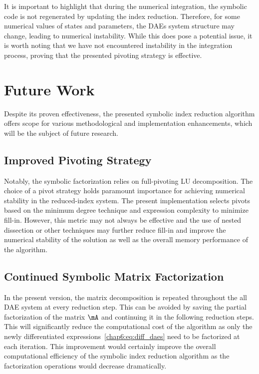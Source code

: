 It is important to highlight that during the numerical integration, the symbolic code is not regenerated by updating the index reduction. Therefore, for some numerical values of states and parameters, the \acp{DAE} system structure may change, leading to numerical instability. While this does pose a potential issue, it is worth noting that we have not encountered instability in the integration process, proving that the presented pivoting strategy is effective.

%


\section{Future Work}
\label{chap6:sec:future_work}

Despite its proven effectiveness, the presented symbolic index reduction algorithm offers scope for various methodological and implementation enhancements, which will be the subject of future research.

\subsection{Improved Pivoting Strategy}

Notably, the symbolic factorization relies on full-pivoting \ac{LU} decomposition. The choice of a pivot strategy holds paramount importance for achieving numerical stability in the reduced-index system. The present implementation selects pivots based on the minimum degree technique and expression complexity to minimize fill-in. However, this metric may not always be effective and the use of nested dissection or other techniques may further reduce fill-in and improve the numerical stability of the solution as well as the overall memory performance of the algorithm.

\subsection{Continued Symbolic Matrix Factorization}

In the present version, the matrix decomposition is repeated throughout the all \ac{DAE} system at every reduction step. This can be avoided by saving the partial factorization of the matrix $\mA$ and continuing it in the following reduction steps. This will significantly reduce the computational cost of the algorithm as only the newly differentiated expressions~\eqref{chap6:eq:diff_daes} need to be factorized at each iteration. This improvement would certainly improve the overall computational efficiency of the symbolic index reduction algorithm as the factorization operations would decrease dramatically.


